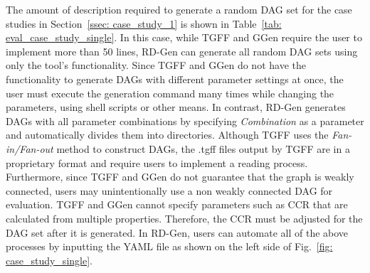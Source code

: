 The amount of description required to generate a random DAG set for the case studies in Section~\ref{ssec: case_study_1} is shown in Table~\ref{tab: eval_case_study_single}.
In this case, while TGFF and GGen require the user to implement more than 50 lines, RD-Gen can generate all random DAG sets using only the tool's functionality.
Since TGFF and GGen do not have the functionality to generate DAGs with different parameter settings at once, the user must execute the generation command many times while changing the parameters, using shell scripts or other means.
In contrast, RD-Gen generates DAGs with all parameter combinations by specifying {\it Combination} as a parameter and automatically divides them into directories.
Although TGFF uses the {\it Fan-in/Fan-out} method to construct DAGs, the .tgff files output by TGFF are in a proprietary format and require users to implement a reading process.
Furthermore, since TGFF and GGen do not guarantee that the graph is weakly connected, users may unintentionally use a non weakly connected DAG for evaluation.
TGFF and GGen cannot specify parameters such as CCR that are calculated from multiple properties. Therefore, the CCR must be adjusted for the DAG set after it is generated.
In RD-Gen, users can automate all of the above processes by inputting the YAML file as shown on the left side of Fig.~\ref{fig: case_study_single}.


\begin{table}[tb]
    \centering
    \caption{Effort required to generate random DAG sets \\ for {\it Case Study 2} \cite{he2021response, gunzel2021suspension, ueter2021hard}}
    \label{tab: eval_case_study_all_timer}
    \renewcommand{\arraystretch}{1.2}
\end{table}


